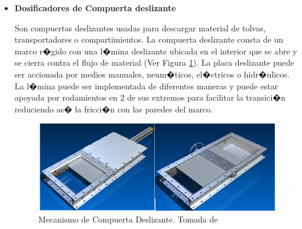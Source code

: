 \begin{itemize}
\begin{itemize}
		\item \textbf{Dosificadores de Compuerta deslizante} %
		
		Son compuertas deslizantes usadas para descargar material de tolvas, transportadores o compartimientos. La
compuerta deslizante consta de un marco r�gido con una l�mina deslizante ubicada en el interior que se abre y se cierra contra el flujo de material (Ver Figura \ref{deslis}). La placa deslizante puede ser accionada por medios manuales, neum�ticos, el�ctricos o hidr�ulicos. La l�mina puede ser implementada de diferentes maneras y puede estar apoyada por rodamientos en 2 de sus extremos para facilitar la transici�n reduciendo as� la fricci�n con las paredes del marco.
	
		\begin{figure}[H]
			\begin{center}
				\includegraphics[scale=0.9]{img/slides.png}
			\end{center}
			\caption{Mecanismo de Compuerta Deslizante. Tomada de \cite{DEM} \label{deslis}}
		\end{figure} %
	\end{itemize}
	


\end{itemize}
